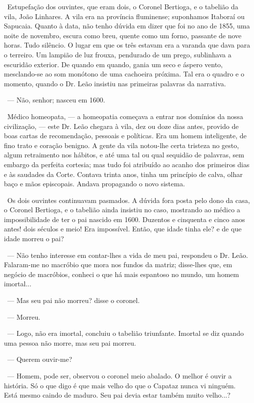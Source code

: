 ~Estupefação dos ouvintes, que eram dois, o Coronel Bertioga, e o
tabelião da vila, João Linhares. A vila era na província fluminense;
suponhamos Itaboraí ou Sapucaia. Quanto à data, não tenho dúvida em
dizer que foi no ano de 1855, uma noite de novembro, escura como breu,
quente como um forno, passante de nove horas. Tudo silêncio. O lugar em
que os três estavam era a varanda que dava para o terreiro. Um lampião
de luz frouxa, pendurado de um prego, sublinhava a escuridão exterior.
De quando em quando, gania um seco e áspero vento, mesclando-se ao som
monótono de uma cachoeira próxima. Tal era o quadro e o momento, quando
o Dr. Leão insistiu nas primeiras palavras da narrativa.

~--- Não, senhor; nasceu em 1600.

~Médico homeopata, --- a homeopatia começava a entrar nos domínios da
nossa civilização, --- este Dr. Leão chegara à vila, dez ou doze dias
antes, provido de boas cartas de recomendação, pessoais e políticas. Era
um homem inteligente, de fino trato e coração benigno. A gente da vila
notou-lhe certa tristeza no gesto, algum retraimento nos hábitos, e até
uma tal ou qual sequidão de palavras, sem embargo da perfeita cortesia;
mas tudo foi atribuído ao acanho dos primeiros dias e às saudades da
Corte. Contava trinta anos, tinha um princípio de calva, olhar baço e
mãos episcopais. Andava propagando o novo sistema.

~Os dois ouvintes continuavam pasmados. A dúvida fora posta pelo dono da
casa, o Coronel Bertioga, e o tabelião ainda insistiu no caso, mostrando
ao médico a impossibilidade de ter o pai nascido em 1600. Duzentos e
cinquenta e cinco anos antes! dois séculos e meio! Era impossível.
Então, que idade tinha ele? e de que idade morreu o pai?

~--- Não tenho interesse em contar-lhes a vida de meu pai, respondeu o
Dr. Leão. Falaram-me no macróbio que mora nos fundos da matriz;
disse-lhes que, em negócio de macróbios, conheci o que há mais espantoso
no mundo, um homem imortal...

~--- Mas seu pai não morreu? disse o coronel.

~--- Morreu.

~--- Logo, não era imortal, concluiu o tabelião triunfante. Imortal se
diz quando uma pessoa não morre, mas seu pai morreu.

~--- Querem ouvir-me?

~--- Homem, pode ser, observou o coronel meio abalado. O melhor é ouvir
a história. Só o que digo é que mais velho do que o Capataz nunca vi
ninguém. Está mesmo caindo de maduro. Seu pai devia estar também muito
velho...?

